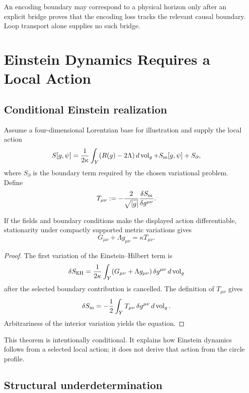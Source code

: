 \documentclass[11pt]{article}
\begin{document}
An encoding boundary may correspond to a physical horizon only after an
explicit bridge proves that the encoding loss tracks the relevant causal
boundary.  Loop transport alone supplies no such bridge.

\section{Einstein Dynamics Requires a Local Action}

\subsection{Conditional Einstein realization}

Assume a four-dimensional Lorentzian base for illustration and supply the
local action
\[
 S[g,\psi]
 =\frac{1}{2\kappa}
   \int_Y (R(g)-2\Lambda)\,d\operatorname{vol}_g
 +S_{\rm m}[g,\psi]
 +S_{\partial},
\]
where $S_{\partial}$ is the boundary term required by the chosen variational
problem.  Define
\[
 T_{\mu\nu}
 :=-\frac{2}{\sqrt{|g|}}
 \frac{\delta S_{\rm m}}{\delta g^{\mu\nu}}.
\]

\begin{theorem}
\label{thm:einstein}
If the fields and boundary conditions make the displayed action
differentiable, stationarity under compactly supported metric variations gives
\[
 G_{\mu\nu}+\Lambda g_{\mu\nu}
 =\kappa T_{\mu\nu}.
\]
\end{theorem}

\begin{proof}
The first variation of the Einstein--Hilbert term is
\[
 \delta S_{\rm EH}
 =\frac{1}{2\kappa}\int_Y
 (G_{\mu\nu}+\Lambda g_{\mu\nu})
 \,\delta g^{\mu\nu}\,d\operatorname{vol}_g
 \]
after the selected boundary contribution is cancelled.  The definition of
$T_{\mu\nu}$ gives
\[
 \delta S_{\rm m}
 =-\frac12\int_Y T_{\mu\nu}\,
 \delta g^{\mu\nu}\,d\operatorname{vol}_g.
\]
Arbitrariness of the interior variation yields the equation.
\end{proof}

This theorem is intentionally conditional.  It explains how Einstein
dynamics follows from a selected local action; it does not derive that action
from the circle profile.

\subsection{Structural underdetermination}
\end{document}
